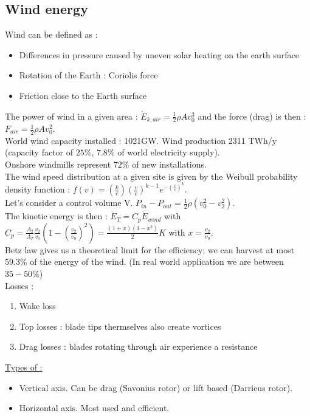 \documentclass[../main.tex]{subfiles}
\begin{document}
\subsection{Wind energy}
Wind can be defined as : \begin{itemize}
    \item Differences in pressure caused by uneven solar heating on the earth surface
    \item Rotation of the Earth : Coriolis force
    \item Friction close to the Earth surface
\end{itemize}
The power of wind in a given area : $\dot{E}_{k,air} = \frac{1}{2}\rho A v_0^3$ and the force (drag) is then : $F_{air} = \frac{1}{2}\rho A v_0^2$.\\
World wind capacity installed : 1021GW. Wind production 2311 TWh/y (capacity factor of $25\%$, $7.8\%$ of world electricity supply).\\
Onshore windmills represent $72\%$ of new installations.\\
The wind speed distribution at a given site is given by the Weibull probability density function : $f(v) = (\frac{k}{c}) (\frac{v}{c})^{k-1} e^{-(\frac{v}{c})^k}$.\\

Let's consider a control volume V. $P_{in}-P_{out} = \frac{1}{2} \rho (v_0^2-v_2^2)$.\\
The kinetic energy is then : $\dot{E}_T = C_p \dot{E}_{wind}$ with $C_p = \frac{A_2}{A_T} \frac{v_2}{v_0} (1-(\frac{v_2}{v_0})^2) = \frac{(1+x)(1-x^2)}{2} K$ with $x =\frac{v_2}{v_0}$.\\

\warning Betz law gives us a theoretical limit for the efficiency; we can harvest at most $59.3\%$ of the energy of the wind. (In real world application we are between $35-50\%$)\\

Losses : \begin{enumerate}
    \item Wake loss 
    \item Top losses : blade tips thermselves also create vortices
    \item Drag losses : blades rotating through air experience a resistance
\end{enumerate}

\quad \underline{Types of :}\\

\begin{itemize}
    \item Vertical axis. Can be drag (Savonius rotor) or lift based (Darrieus rotor).
    \item Horizontal axis. Most used and efficient.
\end{itemize}
\end{document}
